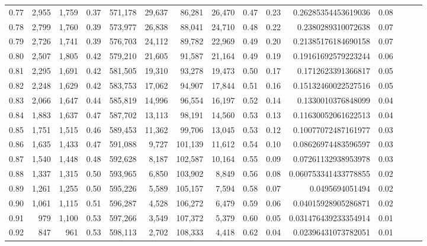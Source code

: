 \begin{tabular}{rrrrrrrrrrrrrrr}
0.77 &   2,955 &  1,759 &  0.37 &  571,178 &   29,637 &   86,281 &   26,470 &  0.47 &  0.23 &     0.26285354453619036 &      0.08 \\
0.78 &   2,799 &  1,760 &  0.39 &  573,977 &   26,838 &   88,041 &   24,710 &  0.48 &  0.22 &      0.2380289310072638 &      0.07 \\
0.79 &   2,726 &  1,741 &  0.39 &  576,703 &   24,112 &   89,782 &   22,969 &  0.49 &  0.20 &     0.21385176184690158 &      0.07 \\
0.80 &   2,507 &  1,805 &  0.42 &  579,210 &   21,605 &   91,587 &   21,164 &  0.49 &  0.19 &     0.19161692579223244 &      0.06 \\
0.81 &   2,295 &  1,691 &  0.42 &  581,505 &   19,310 &   93,278 &   19,473 &  0.50 &  0.17 &      0.1712623391366817 &      0.05 \\
0.82 &   2,248 &  1,629 &  0.42 &  583,753 &   17,062 &   94,907 &   17,844 &  0.51 &  0.16 &     0.15132460022527516 &      0.05 \\
0.83 &   2,066 &  1,647 &  0.44 &  585,819 &   14,996 &   96,554 &   16,197 &  0.52 &  0.14 &      0.1330010376848099 &      0.04 \\
0.84 &   1,883 &  1,637 &  0.47 &  587,702 &   13,113 &   98,191 &   14,560 &  0.53 &  0.13 &     0.11630052061622513 &      0.04 \\
0.85 &   1,751 &  1,515 &  0.46 &  589,453 &   11,362 &   99,706 &   13,045 &  0.53 &  0.12 &     0.10077072487161977 &      0.03 \\
0.86 &   1,635 &  1,433 &  0.47 &  591,088 &    9,727 &  101,139 &   11,612 &  0.54 &  0.10 &     0.08626974483596597 &      0.03 \\
0.87 &   1,540 &  1,448 &  0.48 &  592,628 &    8,187 &  102,587 &   10,164 &  0.55 &  0.09 &     0.07261132938953978 &      0.03 \\
0.88 &   1,337 &  1,315 &  0.50 &  593,965 &    6,850 &  103,902 &    8,849 &  0.56 &  0.08 &    0.060753341433778855 &      0.02 \\
0.89 &   1,261 &  1,255 &  0.50 &  595,226 &    5,589 &  105,157 &    7,594 &  0.58 &  0.07 &         0.0495694051494 &      0.02 \\
0.90 &   1,061 &  1,115 &  0.51 &  596,287 &    4,528 &  106,272 &    6,479 &  0.59 &  0.06 &     0.04015928905286871 &      0.02 \\
0.91 &     979 &  1,100 &  0.53 &  597,266 &    3,549 &  107,372 &    5,379 &  0.60 &  0.05 &    0.031476439233354914 &      0.01 \\
0.92 &     847 &    961 &  0.53 &  598,113 &    2,702 &  108,333 &    4,418 &  0.62 &  0.04 &     0.02396431073782051 &      0.01 \\

\end{tabular}
